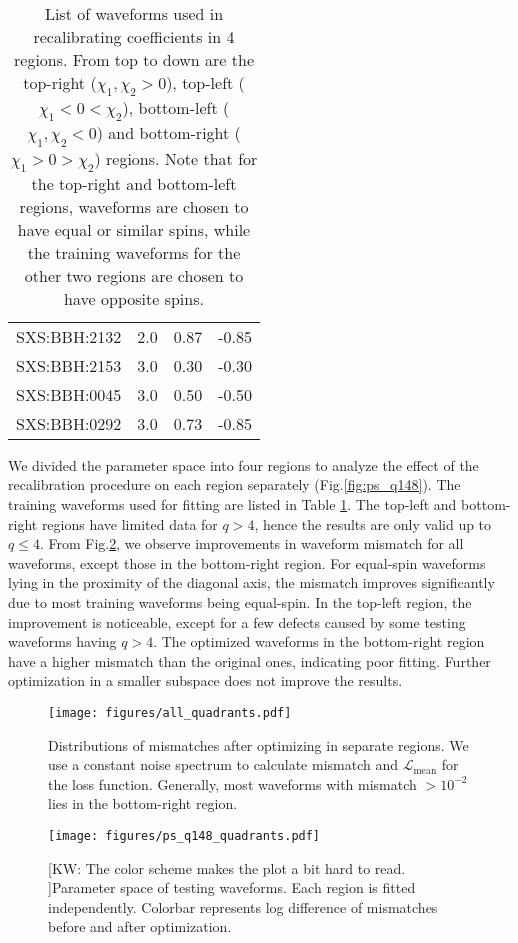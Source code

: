 \documentclass[twocolumn]{aastex631}
\newcommand{\kw}[1]{{\color{rb4}[KW: #1 ]}}
\begin{document}
\begin{table}[t]
\begin{tabularx}{0.8\columnwidth}{@{\extracolsep{\fill}}lrrr}
		SXS:BBH:2132 & 2.0 & 0.87     & -0.85    \\
		SXS:BBH:2153 & 3.0 & 0.30     & -0.30    \\
		SXS:BBH:0045 & 3.0 & 0.50     & -0.50    \\
		SXS:BBH:0292 & 3.0 & 0.73     & -0.85    \\ \midrule\bottomrule
	\end{tabularx}
	\caption{List of waveforms used in recalibrating coefficients in 4 regions. From top to down are the top-right ($\chi_1,\chi_2>0$), top-left ($\chi_1<0<\chi_2$), bottom-left ($\chi_1,\chi_2<0$) and bottom-right ($\chi_1>0>\chi_2$) regions. Note that for the top-right and bottom-left regions, waveforms are chosen to have equal or similar spins, while the training waveforms for the other two regions are chosen to have opposite spins.}
	\label{tab:quadrants}
\end{table}

We divided the parameter space into four regions to analyze the effect of the
recalibration procedure on each region separately (Fig.\ref{fig:ps_q148}). The
training waveforms used for fitting are listed in Table \ref{tab:quadrants}. The
top-left and bottom-right regions have limited data for $q>4$, hence the results are
only valid up to $q\leq4$. From Fig.\ref{fig:ps_q148_quadrant}, we observe
improvements in waveform mismatch for all waveforms, except those in the bottom-right region. For equal-spin waveforms lying in the proximity of the diagonal axis,
the mismatch improves significantly due to most training waveforms being
equal-spin. In the top-left region, the improvement is noticeable, except for a
few defects caused by some testing waveforms having $q>4$. The optimized
waveforms in the bottom-right region have a higher mismatch than the original ones,
indicating poor fitting. Further optimization in a smaller subspace does not
improve the results.

\begin{figure}[t]
	\centering
	\texttt{[image: figures/all\_quadrants.pdf]}
	\caption{Distributions of mismatches after optimizing in separate regions.
	We use a constant noise spectrum to calculate mismatch and
	$\mathcal{L}_{\mathrm{mean}}$ for the loss function. Generally, most
	waveforms with mismatch $>10^{-2}$ lies in the bottom-right region. }
	\label{fig:all_quadrants}
\end{figure}

\begin{figure}[t]
	\centering
	\texttt{[image: figures/ps\_q148\_quadrants.pdf]}
	\caption{\kw{The color scheme makes the plot a bit hard to read.}Parameter
	space of testing waveforms. Each region is fitted independently. Colorbar
	represents log difference of mismatches before and after optimization.}
	\label{fig:ps_q148_quadrant}
\end{figure}
\end{document}
